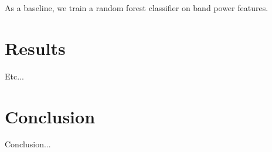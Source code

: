 \documentclass[format=sigconf, nonacm=true, review=true, screen=true]{acmart}
\begin{document}
As a baseline, we train a random forest classifier on band power features.

\section{Results}

Etc...

\section{Conclusion}

Conclusion...



\end{document}
